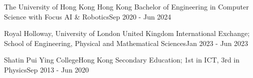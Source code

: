 \resumeSubHeadingListStart

\resumeSubheading
    {The University of Hong Kong}{ Hong Kong}
    {Bachelor of Engineering in Computer Science with Focus AI \& Robotics}{Sep 2020 - Jun 2024}
    
\resumeSubheading
    {Royal Holloway, University of London}{ United Kingdom}
    {International Exchange; School of Engineering, Physical and Mathematical Sciences}{Jan 2023 - Jun 2023}
    
\resumeSubheading
    {Shatin Pui Ying College}{Hong Kong}
    {Secondary Education;   1st in ICT, 3rd in Physics}{Sep 2013 - Jun 2020}
    
\resumeSubHeadingListEnd
